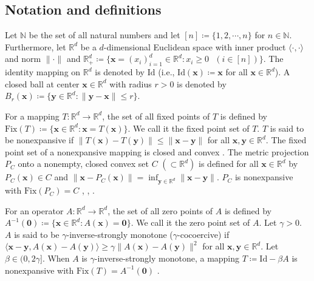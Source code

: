 \documentclass[smallextended,referee,envcountsect,]{svjour3}
\begin{document}
\subsection*{Notation and definitions}
Let $\mathbb{N}$ be the set of all natural numbers and let $[n] \coloneqq \{1,2,\cdots, n\}$ for $n \in \mathbb{N}$. Furthermore, let $\mathbb{R}^d$ be a $d$-dimensional Euclidean space with inner product $\langle \cdot, \cdot \rangle$ and norm $\|\cdot\|$ and $\mathbb{R}_+^d \coloneqq \{ \bm{x} = (x_i)_{i=1}^d \in \mathbb{R}^d \colon x_i \geq 0 \text{ } (i\in [n]) \}$. The identity mapping on $\mathbb{R}^d$ is denoted by $\mathrm{Id}$ (i.e., $\mathrm{Id}(\bm{x}) \coloneqq \bm{x}$ for all $\bm{x} \in \mathbb{R}^d$). A closed ball at center $\bm{x} \in \mathbb{R}^d$ with radius $r > 0$ is denoted by $B_r (\bm{x}) \coloneqq \{ \bm{y} \in \mathbb{R}^d \colon \|\bm{y} - \bm{x} \| \leq r \}$.

For a mapping $T \colon \mathbb{R}^d \to \mathbb{R}^d$, the set of all fixed points of $T$ is defined by $\mathrm{Fix} (T) \coloneqq \{ \bm{x} \in \mathbb{R}^d \colon \bm{x} = T(\bm{x}) \}$. We call it the fixed point set of $T$. $T$ is said to be nonexpansive if $\| T(\bm{x}) - T(\bm{y})\| \leq \|\bm{x} - \bm{y}\|$ for all $\bm{x}, \bm{y} \in \mathbb{R}^d$. The fixed point set of a nonexpansive mapping is closed and convex \cite[Proposition 5.3]{goebel1}. The metric projection $P_C$ onto a nonempty, closed convex set $C$ $(\subset \mathbb{R}^d)$ is defined for all $\bm{x} \in \mathbb{R}^d$ by $P_C (\bm{x}) \in C$ and $\| \bm{x} - P_C (\bm{x}) \| = \inf_{\bm{y} \in \mathbb{R}^d} \| \bm{x} - \bm{y} \|$. $P_C$ is nonexpansive with $\mathrm{Fix}(P_C) = C$ \cite[Theorem 3.1.4(i)]{takahashi}, \cite[p.371]{bau}, \cite[Theorem 2.4-3]{stark}.

For an operator $A \colon \mathbb{R}^d \to \mathbb{R}^d$, the set of all zero points of $A$ is defined by $A^{-1}(\bm{0}) \coloneqq \{ \bm{x} \in \mathbb{R}^d \colon A(\bm{x}) = \bm{0} \}$. We call it the zero point set of $A$. Let $\gamma > 0$. $A$ is said to be $\gamma$-inverse-strongly monotone ($\gamma$-cocoercive) \cite[Definition 4.10]{b-c} if $\langle \bm{x} - \bm{y}, A(\bm{x}) - A(\bm{y}) \rangle \geq \gamma \|A(\bm{x}) - A(\bm{y})\|^2$ for all $\bm{x}, \bm{y} \in \mathbb{R}^d$. Let $\beta \in (0,2 \gamma]$. When $A$ is $\gamma$-inverse-strongly monotone, a mapping $T \coloneqq \mathrm{Id} - \beta A$ is nonexpansive with $\mathrm{Fix}(T) = A^{-1}(\bm{0})$ \cite[Proposition 2.3]{iiduka_JOTA}.
\end{document}
